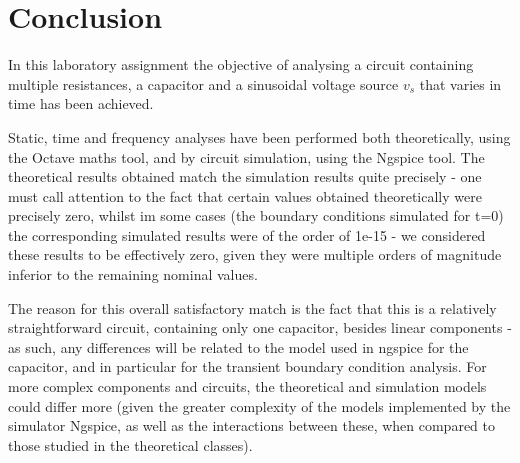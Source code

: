 \section{Conclusion}
\label{sec:conclusion}

In this laboratory assignment the objective of analysing a circuit containing multiple resistances, a capacitor and a sinusoidal voltage source $v_s$ that  varies in time has been achieved.\par
Static, time and frequency analyses have been performed both theoretically, using the Octave maths tool, and by circuit simulation, using the
Ngspice tool. The theoretical results obtained match the simulation results quite precisely - one must call attention to the fact that certain values obtained theoretically were precisely zero, whilst im some cases (the boundary conditions simulated for t=0) the corresponding simulated results were of the order of 1e-15 - we considered these results to be effectively zero, given they were multiple orders of magnitude inferior to the remaining nominal values.\par
The reason for this overall satisfactory match is the fact that this is a
relatively straightforward circuit, containing only one capacitor, besides linear components - as such, any differences will be related to the model used in ngspice for the capacitor, and in particular for the transient boundary condition analysis. For more complex components and circuits, the
theoretical and simulation models could differ more (given the greater complexity of the models implemented by the simulator Ngspice, as well as the interactions between these, when compared to those studied in the theoretical classes).\par

